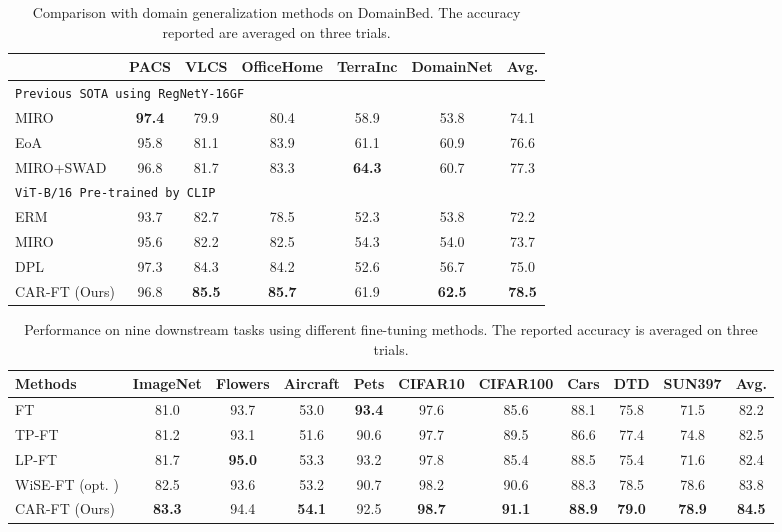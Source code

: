 \documentclass[pdflatex,sn-basic,iicol]{sn-jnl}
\theoremstyle{thmstyleone}\newtheorem{theorem}{Theorem}\newtheorem{proposition}[theorem]{Proposition}
\theoremstyle{thmstyletwo}\newtheorem{example}{Example}\newtheorem{remark}{Remark}
\theoremstyle{thmstylethree}\newtheorem{definition}{Definition}
\begin{document}
\begin{table*}[t]\footnotesize
\begin{center}
\caption{Comparison with domain generalization methods on DomainBed. The accuracy reported are averaged on three trials. }\label{tab:dg}
\begin{tabular}{l|ccccc|c}
\toprule
  & PACS & VLCS & OfficeHome & TerraInc & DomainNet & Avg. \\
\midrule
\multicolumn{7}{l}{\texttt{Previous SOTA using RegNetY-16GF}} \\
MIRO~\citep{cha2022domain} & \textbf{97.4} & 79.9 & 80.4 & 58.9 & 53.8 & 74.1 \\
EoA~\citep{arpit2021ensemble}  & 95.8 & 81.1 & 83.9 & 61.1 & 60.9 & 76.6 \\
MIRO+SWAD~\citep{cha2022domain,cha2021swad} & 96.8 & 81.7 & 83.3 & \textbf{64.3} & 60.7 & 77.3 \\
\midrule

\multicolumn{7}{l}{\texttt{ViT-B/16 Pre-trained by CLIP}} \\
ERM & 93.7 & 82.7 & 78.5 & 52.3 & 53.8 & 72.2 \\
MIRO~\citep{cha2022domain}  & 95.6 & 82.2 & 82.5 & 54.3 & 54.0 & 73.7 \\
DPL~\citep{zhang2022domain} & 97.3 & 84.3 & 84.2 & 52.6 & 56.7 & 75.0 \\
\rowcolor{tabhighlight}
CAR-FT (Ours)  & 96.8 & \textbf{85.5} & \textbf{85.7} & 61.9 & \textbf{62.5} & \textbf{78.5} \\
\bottomrule
\end{tabular}
\end{center}
\end{table*}
\begin{table*}[t]\footnotesize
\begin{center}
\caption{Performance on nine downstream tasks using different fine-tuning methods. The reported accuracy is averaged on three trials. }\label{tab:downstream}
\begin{tabular}{l|ccccccccc|c}
\toprule
 Methods & ImageNet & Flowers & Aircraft & Pets & CIFAR10 & CIFAR100 & Cars & DTD & SUN397 & Avg. \\
\midrule
FT & 81.0 & 93.7 & 53.0 & \textbf{93.4} & 97.6 & 85.6 & 88.1 & 75.8 & 71.5 & 82.2\\
TP-FT & 81.2 & 93.1 & 51.6 & 90.6 & 97.7 & 89.5 & 86.6 & 77.4 & 74.8 & 82.5 \\
LP-FT & 81.7 & \textbf{95.0} & 53.3 & 93.2 & 97.8 & 85.4 & 88.5 & 75.4 & 71.6 & 82.4 \\
WiSE-FT (opt. ) & 82.5 & 93.6 & 53.2 & 90.7 & 98.2 & 90.6 & 88.3 & 78.5 & 78.6 & 83.8\\
\rowcolor{tabhighlight}
CAR-FT (Ours) & \textbf{83.3} & 94.4 & \textbf{54.1} & 92.5 & \textbf{98.7} & \textbf{91.1} & \textbf{88.9} & \textbf{79.0} & \textbf{78.9} & \textbf{84.5}\\

\bottomrule
\end{tabular}
\end{center}
\end{table*}
\end{document}
